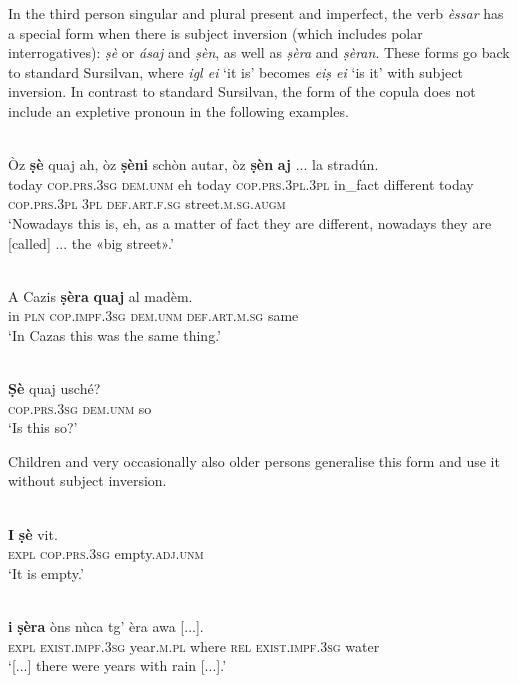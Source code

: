 In the third person singular and plural present and imperfect, the verb \textit{èssar} has a special form when there is subject inversion (which includes polar interrogatives): \textit{ṣè} or \textit{ásaj} and \textit{ṣèn}, as well as \textit{ṣèra} and \textit{ṣèran}. These forms go back to standard Sursilvan, where \textit{igl ei} `it is' becomes \textit{eiṣ ei} `is it' with subject inversion. In contrast to standard Sursilvan, the form of the copula does not include an expletive pronoun in the following examples.

\ea
\label{}
\\
\gll    Òz \textbf{ṣè} quaj ah, òz \textbf{ṣèni} schòn autar, òz \textbf{ṣèn} \textbf{aj} ... la stradún. \\
today \textsc{cop.prs.3sg} \textsc{dem.unm} eh today \textsc{cop.prs.3pl.3pl} in\_fact different today \textsc{cop.prs.3pl} \textsc{3pl} {} \textsc{def.art.f.sg} street.\textsc{m.sg.augm} \\
\glt `Nowadays this is, eh, as a matter of fact they are different, nowadays they are [called] ... the «big street».'
\z

\ea
\label{}
\\
\gll    A Cazis \textbf{ṣèra} \textbf{quaj} al madèm.\\
in \textsc{pln} \textsc{cop.impf.3sg} \textsc{dem.unm} \textsc{def.art.m.sg} same\\
\glt `In Cazas this was the same thing.'
\z

\ea
\label{}
\\
\gll \textbf{Ṣè} quaj usché?\\
\textsc{cop.prs.3sg} \textsc{dem.unm} so\\
\glt `Is this so?'
\z

Children and very occasionally also older persons generalise this form and use it without subject inversion.

\ea
\label{}
\\
\gll \textbf{I} \textbf{ṣè} vit.\\
\textsc{expl} \textsc{cop.prs.3sg} empty.\textsc{adj.unm}\\
\glt `It is empty.'
\z

\ea
\label{}
\\
\gll [...] \textbf{i} \textbf{ṣèra} òns nùca tg’ èra awa [...].\\
{} \textsc{expl} \textsc{exist.impf.3sg} year.\textsc{m.pl} where \textsc{rel} \textsc{exist.impf.3sg} water \\
\glt `[...] there were years with rain [...].'
\z

